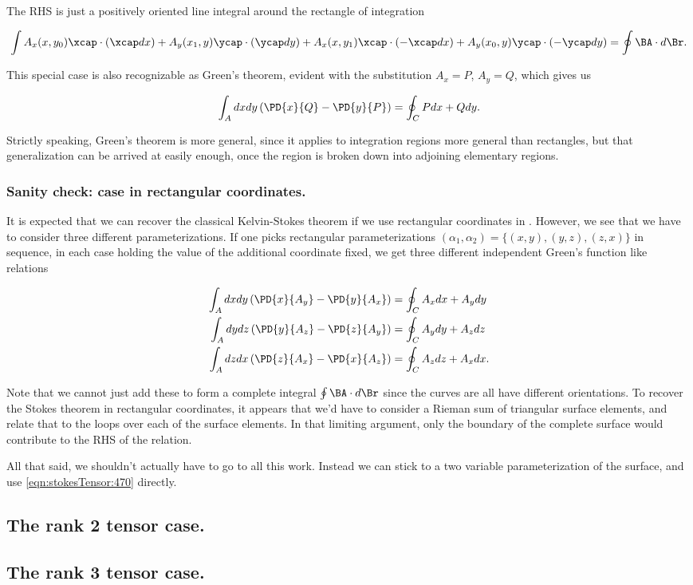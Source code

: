 The RHS is just a positively oriented line integral around the rectangle of integration

\begin{equation}\label{eqn:stokesTensor:510}
\int
A_x(x, y_0) \xcap \cdot ( \xcap dx )
+ A_y(x_1, y) \ycap \cdot ( \ycap dy )
+ A_x(x, y_1) \xcap \cdot ( -\xcap dx )
+ A_y(x_0, y) \ycap \cdot ( -\ycap dy )
= \oint \BA \cdot d\Br.
\end{equation}

This special case is also recognizable as Green's theorem, evident with the substitution $A_x = P$, $A_y = Q$, which gives us

\begin{equation}\label{eqn:stokesTensor:530}
\int_A dx dy \left( \PD{x}{Q} - \PD{y}{P} \right)
=
\oint_C P dx + Q dy.
\end{equation}

Strictly speaking, Green's theorem is more general, since it applies to integration regions more general than rectangles, but that generalization can be arrived at easily enough, once the region is broken down into adjoining elementary regions.

\subsubsection{Sanity check:  case in rectangular coordinates.}

It is expected that we can recover the classical Kelvin-Stokes theorem if we use rectangular coordinates in .  However, we see that we have to consider three different parameterizations.  If one picks rectangular parameterizations $(\alpha_1, \alpha_2) = \{ (x,y), (y,z), (z,x) \}$ in sequence, in each case holding the value of the additional coordinate fixed, we get three different independent Green's function like relations

\begin{align}\label{eqn:stokesTensor:550}
\int_A dx dy \left( \PD{x}{A_y} - \PD{y}{A_x} \right) &= \oint_C A_x dx + A_y dy \\
\int_A dy dz \left( \PD{y}{A_z} - \PD{z}{A_y} \right) &= \oint_C A_y dy + A_z dz \\
\int_A dz dx \left( \PD{z}{A_x} - \PD{x}{A_z} \right) &= \oint_C A_z dz + A_x dx.
\end{align}

Note that we cannot just add these to form a complete integral $\oint \BA \cdot d\Br$ since the curves are all have different orientations.  To recover the  Stokes theorem in rectangular coordinates, it appears that we'd have to consider a Rieman sum of triangular surface elements, and relate that to the loops over each of the surface elements.  In that limiting argument, only the boundary of the complete surface would contribute to the RHS of the relation.

All that said, we shouldn't actually have to go to all this work.  Instead we can stick to a two variable parameterization of the surface, and use \ref{eqn:stokesTensor:470} directly.

\subsection{The rank 2 tensor case.}
\subsection{The rank 3 tensor case.}

\EndNoBibArticle
